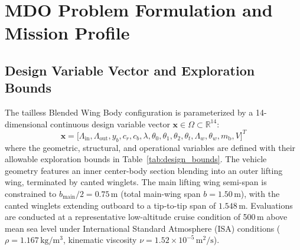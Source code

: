 \section{MDO Problem Formulation and Mission Profile}
\label{sec:formulation}

\subsection{Design Variable Vector and Exploration Bounds}
The tailless Blended Wing Body configuration is parameterized by a 14-dimensional continuous design variable vector $\mathbf{x} \in \Omega \subset \mathbb{R}^{14}$:
\begin{equation}
\mathbf{x} = \big[ \Lambda_{\mathrm{in}}, \Lambda_{\mathrm{out}}, y_{b}, c_{r}, c_{b}, \lambda, \theta_0, \theta_1, \theta_2, \theta_t, \Lambda_w, \theta_w, m_{\mathrm{b}}, V \big]^T
\end{equation}
where the geometric, structural, and operational variables are defined with their allowable exploration bounds in Table~\ref{tab:design_bounds}. The vehicle geometry features an inner center-body section blending into an outer lifting wing, terminated by canted winglets. The main lifting wing semi-span is constrained to $b_{\mathrm{main}}/2 = 0.75\,\mathrm{m}$ (total main-wing span $b = 1.50\,\mathrm{m}$), with the canted winglets extending outboard to a tip-to-tip span of $1.548\,\mathrm{m}$. Evaluations are conducted at a representative low-altitude cruise condition of 500\,m above mean sea level under International Standard Atmosphere (ISA) conditions ($\rho = 1.167\,\mathrm{kg/m^3}$, kinematic viscosity $\nu = 1.52 \times 10^{-5}\,\mathrm{m^2/s}$).

